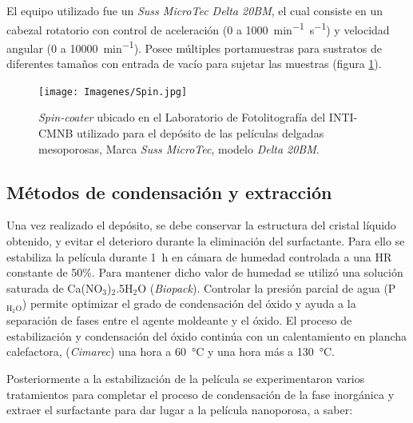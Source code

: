 			 El equipo utilizado fue un \textit{Suss MicroTec Delta 20BM}, el cual consiste en un cabezal rotatorio con control de aceleración (0 a  \SI{1000}{\minute^{-1}.\second^{-1}}) y velocidad angular (0 a \SI{10000}{\minute^{-1}}). Posee múltiples portamuestras para sustratos de diferentes tamaños con entrada de vacío para sujetar las muestras (figura \ref{fig:spin}).   		   


				\begin{figure}[h!]
					  \begin{center}
					  \texttt{[image: Imagenes/Spin.jpg]}
					  \caption[Equipo para el depósito de películas delgadas, \textit{spin-coater}]{\textit{Spin-coater} ubicado en el Laboratorio de Fotolitografía del INTI-CMNB utilizado para el depósito de las películas delgadas mesoporosas, Marca \textit{Suss MicroTec}, modelo \textit{Delta 20BM}.}
					  \label{fig:spin}
					  \end{center}
					  \end{figure}
	
	\subsection{Métodos de condensación y extracción}\label{sec:cond_y_extr}

		Una vez realizado el depósito, se debe conservar la estructura del cristal líquido obtenido, y evitar el deterioro durante la eliminación del surfactante. Para ello se estabiliza la película durante \SI{1}{\hour} en cámara de humedad controlada a una HR constante de 50\%. Para mantener dicho valor de humedad se utilizó una solución saturada de Ca(NO$_3$)$_2$.5H$_2$O (\textit{Biopack}). Controlar la presión parcial de agua (P$_{\text{H}_2\text{O}}$) permite optimizar el grado de condensación del óxido y ayuda a la separación de fases entre el agente moldeante y el óxido\cite{Crepaldi2003}. El proceso de estabilización y condensación del óxido continúa con un calentamiento en plancha calefactora, (\textit{Cimarec}) una hora a \SI{60}{\celsius} y una hora más a \SI{130}{\celsius}\cite{Crepaldi2003,Crepaldi2002a}. 
				
		Posteriormente a la estabilización de la película se experimentaron varios tratamientos para completar el proceso de condensación de la fase inorgánica y extraer el surfactante para dar lugar a la película nanoporosa, a saber:

